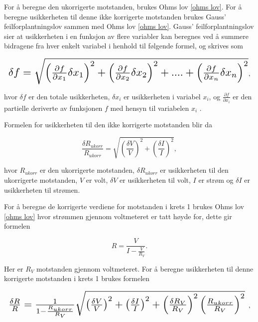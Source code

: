 \documentclass[twocolumn, a4paper, 11pt]{article} %
\begin{document}
For å beregne den ukorrigerte motstanden, brukes Ohms lov \eqref{ohms lov}. For å beregne usikkerheten til denne ikke korrigerte motstanden brukes Gauss’ feilforplantningslov sammen med Ohms lov \eqref{ohms lov}. Gauss’ feilforplantningslov sier at usikkerheten i en funksjon av flere variabler kan beregnes ved å summere bidragene fra hver enkelt variabel i henhold til følgende formel, og skrives som 

\begin{equation}
\resizebox{1.0\hsize}{!}{$
\delta f = \sqrt{{\left(\frac{\partial f}{\partial x_1} \delta x_1\right)}^2 + {\left(\frac{\partial f}{\partial x_2} \delta x_2 \right)}^2 + .... +{\left(\frac{\partial f}{\partial x_n} {\delta x_n} \right)}^2}
$},
\label{usikkerhet_f}
\end{equation}

hvor $\delta f$ er den totale usikkerheten, $\delta x_i$ er usikkerheten i variabel $x_i$, og $\frac{\partial f}{\partial x_i}$ er den partielle deriverte av funksjonen $f$ med hensyn til variabelen $x_i$ \cite{taylor1997error}.

Formelen for usikkerheten til den ikke korrigerte motstanden blir da

\begin{equation}
    \frac{\delta R_{ukorr}}{R_{ukorr}} = \sqrt{\left(\frac{\delta V}{V}\right)^2 + \left(\frac{\delta I}{I}\right)^2},
    \label{formel_krets1og2_delta_R_ukorr}
\end{equation}

hvor $R_{ukorr}$ er den ukorrigerte motstanden, $\delta R_{ukorr}$ er usikkerheten til den ukorrigerte motstanden, $V$ er volt, $\delta V$ er usikkerheten til volt, $I$ er strøm og $\delta I$ er usikkerheten til strømen.

\bigskip

For  å beregne de korrigerte verdiene for motstanden i krets 1 brukes Ohms lov \eqref{ohms lov} hvor strømmen gjennom voltmeteret er tatt høyde for, dette gir formelen

\begin{equation}
    R = \frac{V}{I - \frac{V}{R_V}}.
    \label{formel_krets1_R_korr}
\end{equation}

Her er $R_V$ motstanden gjennom voltmeteret. For å beregne usikkerheten til denne korrigerte motstanden i krets 1 brukes formelen

\begin{equation}
\resizebox{1.0\hsize}{!}{$
    \frac{\delta R}{R} = \frac{1}{1- \frac{R_{ukorr}}{R_V}}
    \sqrt{\left(\frac{\delta V}{V}\right)^2 + \left(\frac{\delta I}{I}\right)^2 + \left(\frac{\delta R_V}{R_V}\right)^2 \left(\frac{R_{ukorr}}{R_V}\right)^2}$
    },
    \label{formel_krets1_delta_R_korr}
\end{equation}
\end{document}

